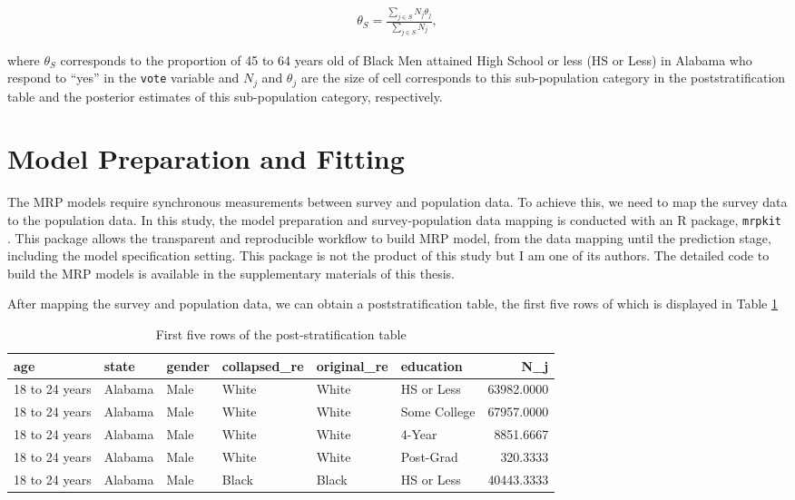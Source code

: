 \documentclass{monashthesis}
\begin{document}
\begin{equation} 
\begin{split}
\theta_S = \frac{\sum_{j\in S}N_j\theta_j}{\sum_{j\in S}N_j},
\end{split}
\label{eq:poststrat-observed}
\end{equation}

where \(\theta_S\) corresponds to the proportion of 45 to 64 years old of Black Men attained High School or less (HS or Less) in Alabama who respond to ``yes'' in the \texttt{vote} variable and \(N_j\) and \(\theta_j\) are the size of cell corresponds to this sub-population category in the poststratification table and the posterior estimates of this sub-population category, respectively.

\hypertarget{prep}{%
\section{Model Preparation and Fitting}\label{prep}}

The MRP models require synchronous measurements between survey and population data. To achieve this, we need to map the survey data to the population data. In this study, the model preparation and survey-population data mapping is conducted with an R package, \texttt{mrpkit} \autocite{mrpkit}. This package allows the transparent and reproducible workflow to build MRP model, from the data mapping until the prediction stage, including the model specification setting. This package is not the product of this study but I am one of its authors. The detailed code to build the MRP models is available in the supplementary materials of this thesis.

After mapping the survey and population data, we can obtain a poststratification table, the first five rows of which is displayed in Table \ref{tab:post-strat-table}

\begin{table}

\caption{\label{tab:post-strat-table}First five rows of the post-stratification table}
\centering
\begin{tabular}[t]{llllllr}
\toprule
age & state & gender & collapsed\_re & original\_re & education & N\_j\\
\midrule
18 to 24 years & Alabama & Male & White & White & HS or Less & 63982.0000\\
18 to 24 years & Alabama & Male & White & White & Some College & 67957.0000\\
18 to 24 years & Alabama & Male & White & White & 4-Year & 8851.6667\\
18 to 24 years & Alabama & Male & White & White & Post-Grad & 320.3333\\
18 to 24 years & Alabama & Male & Black & Black & HS or Less & 40443.3333\\
\bottomrule
\end{tabular}
\end{table}
\end{document}

